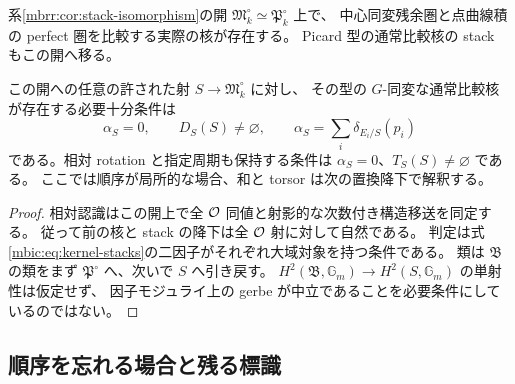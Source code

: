 \begin{corollary}[全構造対象開上の比較と二つの障害]
\label{mbic:cor:all-o}
系\ref{mbrr:cor:stack-isomorphism}の開
$\mathfrak M_k^\circ\simeq\mathfrak P_k^\circ$ 上で、
中心同変残余圏と点曲線積の perfect 圏を比較する実際の核が存在する。
Picard 型の通常比較核の stack もこの開へ移る。

この開への任意の許された射 $S\to\mathfrak M_k^\circ$ に対し、
その型の $G$-同変な通常比較核が存在する必要十分条件は
\[
 \alpha_S=0,\qquad D_S(S)\ne\varnothing,
 \qquad
 \alpha_S=\sum_i\delta_{E_i/S}(p_i)
\]
である。相対 rotation と指定周期も保持する条件は
$\alpha_S=0$、$T_S(S)\ne\varnothing$ である。
ここでは順序が局所的な場合、和と torsor は次の置換降下で解釈する。
\end{corollary}
\begin{proof}
相対認識はこの開上で全 $\mathcal O$ 同値と射影的な次数付き構造移送を同定する。
従って前の核と stack の降下は全 $\mathcal O$ 射に対して自然である。
判定は式\eqref{mbic:eq:kernel-stacks}の二因子がそれぞれ大域対象を持つ条件である。
類は $\mathfrak B$ の類をまず $\mathfrak P^\circ$ へ、次いで $S$ へ引き戻す。
$H^2(\mathfrak B,\mathbb G_m)\to H^2(S,\mathbb G_m)$ の単射性は仮定せず、
因子モジュライ上の gerbe が中立であることを必要条件にしているのではない。
\end{proof}

\subsection{順序を忘れる場合と残る標識}

